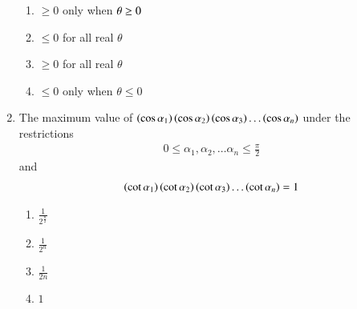 \begin{enumerate}[label=\thesubsection.\arabic*,ref=\thesubsection.\theenumi]
        \hfill{}
        \begin{enumerate}
                \item $\ge0$ only when $\theta\newline\ge0$
                \item $\le0$ for all real $\theta$
                \item $\ge0$ for all real $\theta$
                \item $\le0$ only when $\theta\le0$
        \end{enumerate}
    \item The maximum value of $\left(\cos{\alpha_1}\right)\left(\cos{\alpha_2}\right)\left(\cos{\alpha_3}\right)\dots\left(\cos{\alpha_n}\right)$ under the restrictions
   	\begin{align*} 
		0\le\alpha_1,\alpha_2,\dots\alpha_n\le\frac{\pi}{2}
	\end {align*} and 
	\begin{align*}
		\left(\cot{\alpha_1}\right)\left(\cot{\alpha_2}\right)\left(\cot{\alpha_3}\right)\dots\left(\cot{\alpha_n}\right) = 1
	\end{align*}
        \hfill{}
        \begin{enumerate}
                \item $\frac{1}{2^{\frac{n}{2}}}$
                \item $\frac{1}{2^{n}}$
                \item $\frac{1}{2n}$
                \item $1$
        \end{enumerate}
  

\end{enumerate}
